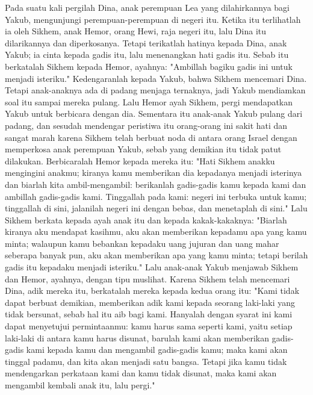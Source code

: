 \begin{biblechapter} %
 Pada suatu kali pergilah Dina, anak perempuan Lea yang dilahirkannya bagi Yakub, mengunjungi perempuan-perempuan di negeri itu.
\verse Ketika itu terlihatlah ia oleh Sikhem, anak Hemor, orang Hewi, raja negeri itu, lalu Dina itu dilarikannya dan diperkosanya.
\verse Tetapi terikatlah hatinya kepada Dina, anak Yakub; ia cinta kepada gadis itu, lalu menenangkan hati gadis itu.
\verse Sebab itu berkatalah Sikhem kepada Hemor, ayahnya: "Ambillah bagiku gadis ini untuk menjadi isteriku."
\verse Kedengaranlah kepada Yakub, bahwa Sikhem mencemari Dina. Tetapi anak-anaknya ada di padang menjaga ternaknya, jadi Yakub mendiamkan soal itu sampai mereka pulang.
\verse Lalu Hemor ayah Sikhem, pergi mendapatkan Yakub untuk berbicara dengan dia.
\verse Sementara itu anak-anak Yakub pulang dari padang, dan sesudah mendengar peristiwa itu orang-orang ini sakit hati dan sangat marah karena Sikhem telah berbuat noda di antara orang Israel dengan memperkosa anak perempuan Yakub, sebab yang demikian itu tidak patut dilakukan.
\verse Berbicaralah Hemor kepada mereka itu: "Hati Sikhem anakku mengingini anakmu; kiranya kamu memberikan dia kepadanya menjadi isterinya
\verse dan biarlah kita ambil-mengambil: berikanlah gadis-gadis kamu kepada kami dan ambillah gadis-gadis kami.
\verse Tinggallah pada kami: negeri ini terbuka untuk kamu; tinggallah di sini, jalanilah negeri ini dengan bebas, dan menetaplah di sini."
\verse Lalu Sikhem berkata kepada ayah anak itu dan kepada kakak-kakaknya: "Biarlah kiranya aku mendapat kasihmu, aku akan memberikan kepadamu apa yang kamu minta;
\verse walaupun kamu bebankan kepadaku uang jujuran dan uang mahar seberapa banyak pun, aku akan memberikan apa yang kamu minta; tetapi berilah gadis itu kepadaku menjadi isteriku."
\verse Lalu anak-anak Yakub menjawab Sikhem dan Hemor, ayahnya, dengan tipu muslihat. Karena Sikhem telah mencemari Dina, adik mereka itu,
\verse berkatalah mereka kepada kedua orang itu: "Kami tidak dapat berbuat demikian, memberikan adik kami kepada seorang laki-laki yang tidak bersunat, sebab hal itu aib bagi kami.
\verse Hanyalah dengan syarat ini kami dapat menyetujui permintaanmu: kamu harus sama seperti kami, yaitu setiap laki-laki di antara kamu harus disunat,
\verse barulah kami akan memberikan gadis-gadis kami kepada kamu dan mengambil gadis-gadis kamu; maka kami akan tinggal padamu, dan kita akan menjadi satu bangsa.
\verse Tetapi jika kamu tidak mendengarkan perkataan kami dan kamu tidak disunat, maka kami akan mengambil kembali anak itu, lalu pergi."

\end{biblechapter}
